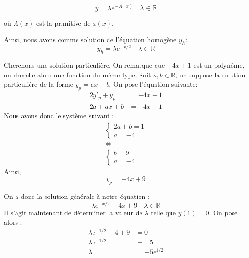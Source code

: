 \documentclass{article}
\begin{document}
\begin{equation*}
y = \lambda e^{-A(x)} \quad  \lambda\in \mathbb{R}
\end{equation*}

où $A(x)$ est la primitive de $a(x)$. 

Ainsi, nous avons comme solution de l'équation homogène $y_h$:
\begin{equation*}
y_{h} = \lambda e^{-x/2}\quad \lambda\in \mathbb{R}
\end{equation*}

Cherchons une solution particulière. On remarque que $-4x+1$ est un polynôme, on cherche alors une fonction du même type.
Soit $a,b \in \mathbb{R}$, on suppose la solution particulière de la forme $y_{p} = ax+b$.
On pose l'équation suivante:
\begin{equation*}
\begin{aligned}
 2y'_{p} + y_{p} &= -4x+1 \\
 2a + ax + b &= -4x + 1
\end{aligned}
\end{equation*}
Nous avons donc le système suivant :
\begin{equation*}
\begin{gathered}
\begin{cases}
2a+b = 1\\
a = -4
\end{cases} \\
\Leftrightarrow \\
\begin{cases}
b = 9\\
a = -4
\end{cases}
\end{gathered}
\end{equation*}
Ainsi,
\begin{equation*}
y_{p} = -4x+9
\end{equation*}

On a donc la solution générale à notre équation :
\begin{equation*}
\lambda e^{-x/2} -4x+9\quad \lambda\in \mathbb{R}
\end{equation*}
Il s'agit maintenant de déterminer la valeur de $\lambda$ telle que $y(1)=0$.
On pose alors : 
\begin{equation*}
\begin{aligned}
\lambda e^{-1/2} -4+9 &= 0 \\
\lambda e^{-1/2}  &= -5 \\
\lambda   &= -5e^{1/2} 
\end{aligned}
\end{equation*}
\end{document}
